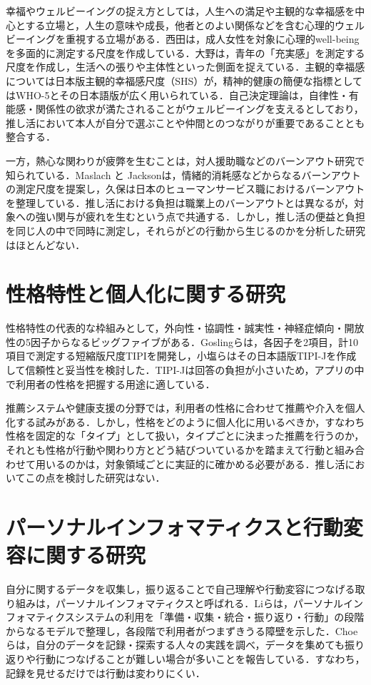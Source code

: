 幸福やウェルビーイングの捉え方としては，人生への満足や主観的な幸福感を中心とする立場と，人生の意味や成長，他者とのよい関係などを含む心理的ウェルビーイングを重視する立場がある．西田\cite{nishida2000}は，成人女性を対象に心理的well-beingを多面的に測定する尺度を作成している．大野\cite{ono1984}は，青年の「充実感」を測定する尺度を作成し，生活への張りや主体性といった側面を捉えている．主観的幸福感については日本版主観的幸福感尺度（SHS）\cite{shimai2004}が，精神的健康の簡便な指標としてはWHO-5\cite{topp2015}とその日本語版\cite{inagaki2013}が広く用いられている．自己決定理論\cite{ryan2000}は，自律性・有能感・関係性の欲求が満たされることがウェルビーイングを支えるとしており，推し活において本人が自分で選ぶことや仲間とのつながりが重要であることとも整合する．

一方，熱心な関わりが疲弊を生むことは，対人援助職などのバーンアウト研究で知られている．Maslach と Jackson\cite{maslach1981}は，情緒的消耗感などからなるバーンアウトの測定尺度を提案し，久保\cite{kubo2007}は日本のヒューマンサービス職におけるバーンアウトを整理している．推し活における負担は職業上のバーンアウトとは異なるが，対象への強い関与が疲れを生むという点で共通する．しかし，推し活の便益と負担を同じ人の中で同時に測定し，それらがどの行動から生じるのかを分析した研究はほとんどない．

\section{性格特性と個人化に関する研究}
性格特性の代表的な枠組みとして，外向性・協調性・誠実性・神経症傾向・開放性の5因子からなるビッグファイブがある．Goslingら\cite{gosling2003}は，各因子を2項目，計10項目で測定する短縮版尺度TIPIを開発し，小塩ら\cite{oshio2012}はその日本語版TIPI-Jを作成して信頼性と妥当性を検討した．TIPI-Jは回答の負担が小さいため，アプリの中で利用者の性格を把握する用途に適している．

推薦システムや健康支援の分野では，利用者の性格に合わせて推薦や介入を個人化する試みがある．しかし，性格をどのように個人化に用いるべきか，すなわち性格を固定的な「タイプ」として扱い，タイプごとに決まった推薦を行うのか，それとも性格が行動や関わり方とどう結びついているかを踏まえて行動と組み合わせて用いるのかは，対象領域ごとに実証的に確かめる必要がある．推し活においてこの点を検討した研究はない．

\section{パーソナルインフォマティクスと行動変容に関する研究}
自分に関するデータを収集し，振り返ることで自己理解や行動変容につなげる取り組みは，パーソナルインフォマティクスと呼ばれる．Liら\cite{li2010}は，パーソナルインフォマティクスシステムの利用を「準備・収集・統合・振り返り・行動」の段階からなるモデルで整理し，各段階で利用者がつまずきうる障壁を示した．Choeら\cite{choe2014}は，自分のデータを記録・探索する人々の実践を調べ，データを集めても振り返りや行動につなげることが難しい場合が多いことを報告している．すなわち，記録を見せるだけでは行動は変わりにくい．

